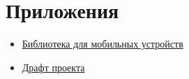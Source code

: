 \section{Приложения}

\begin{itemize}
    \item \href{https://github.com/kaikash/hse-study-project/new\_lib}{Библиотека для мобильных устройств}
    \item \href{https://github.com/kaikash/hse-study-project}{Драфт проекта}
\end{itemize}